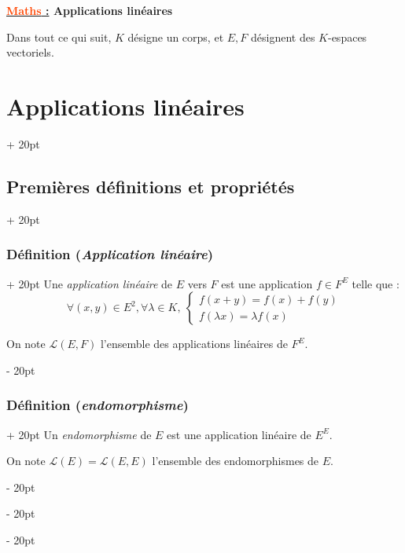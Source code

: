 \documentclass[a4paper, 12pt, twoside]{article}
\renewcommand{\emph}{\textcolor{ff4500}}
\newcommand{\ind}[1][20pt]{\advance\leftskip + #1}
\newcommand{\deind}[1][20pt]{\advance\leftskip - #1}
\newenvironment{indt}[2][20pt]{#2 \par \ind[#1]}{\par \deind} %
\newcommand{\thetitle}[2]{\begin{center}\textbf{{\LARGE \underline{\emph{#1} :}} {\Large #2}}\end{center}}
\begin{document}
    
    
    \thetitle{Maths}{Applications linéaires}
    
    \tableofcontents
    \newpage


    Dans tout ce qui suit, $K$ désigne un corps, et $E, F$ désignent des $K$-espaces vectoriels.
    
    
    \begin{indt}{\section{Applications linéaires}}
        
        \begin{indt}{\subsection{Premières définitions et propriétés}}
            \begin{indt}{\subsubsection{Définition (\textit{Application linéaire})}}
                Une \textit{application linéaire} de $E$ vers $F$ est une application $f \in F^E$ telle que :
                \[
                    \forall (x, y) \in E^2, \forall \lambda \in K,\
                    \begin{cases}
                        f(x + y) = f(x) + f(y)
                        \\
                        f(\lambda x) = \lambda f(x)
                    \end{cases}
                \]

                On note $\mathcal L(E, F)$ l'ensemble des applications linéaires de $F^E$.
            \end{indt}

            \vspace{12pt}
            
            \begin{indt}{\subsubsection{Définition (\textit{endomorphisme})}}
                Un \textit{endomorphisme} de $E$ est une application linéaire de $E^E$.

                On note $\mathcal L(E) = \mathcal L(E, E)$ l'ensemble des endomorphismes de $E$.
            \end{indt}


\end{indt}
\end{indt}
\end{document}
